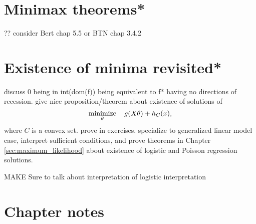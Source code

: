 \section{Minimax theorems*}
\label{sec:minimax_theorems}

?? consider Bert chap 5.5 or BTN chap 3.4.2 

\section{Existence of minima revisited*}
\label{sec:existence_minima_revisited}

discuss 0 being in int(dom(f)) being equivalent to f* having no directions
of recession.  give nice proposition/theorem about existence of solutions of 
$$
\operatorname*{minimize}_\theta \quad g(X \theta) + h_C(x),
$$
where $C$ is a convex set. prove in exercises. specialize to generalized linear
model case, interpret sufficient conditions, and prove theorems in Chapter
\ref{sec:maximum_likelihood} about existence of logistic and Poisson regression
solutions. 

MAKE Sure to talk about interpretation of logistic interpretation

\SkipTocEntry\section*{Chapter notes}

